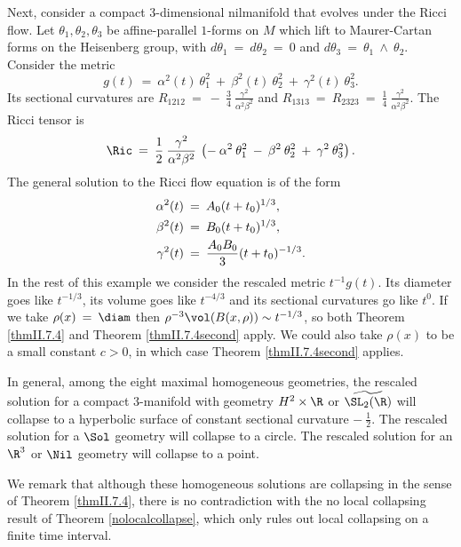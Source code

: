 \begin{remark}
Next, consider a compact
$3$-dimensional nilmanifold that evolves under the Ricci flow.
Let $\theta_1, \theta_2, \theta_3$ be affine-parallel $1$-forms on $M$
which lift to Maurer-Cartan forms on the Heisenberg group, with
$d\theta_1 \: = \: d\theta_2 \: = \: 0$ and $d\theta_3 \: = \:
\theta_1 \: \wedge \: \theta_2$.
Consider the metric
\begin{equation}
g(t) \: = \: \alpha^2(t) \: \theta_1^2 \: + \:
\beta^2(t) \: \theta_2^2 \: + \:
\gamma^2(t) \: \theta_3^2.
\end{equation}
Its sectional curvatures are
$R_{1212} \: = \: - \: \frac34 \: \frac{\gamma^2}{\alpha^2 \beta^2}$ and
$R_{1313} \: = \: R_{2323}
\: = \: \frac14 \: \frac{\gamma^2}{\alpha^2 \beta^2}$.
The Ricci tensor is
\begin{equation}
\Ric \: = \: \frac12 \: \frac{\gamma^2}{\alpha^2 \beta^2} \:
\left( - \: \alpha^2 \: \theta_1^2 \: - \: \beta^2 \: \theta_2^2 \:
+ \: \gamma^2 \: \theta_3^2 \right).
\end{equation}
The general solution to the Ricci flow equation is of the form
\begin{align}
\alpha^2(t) \: & = \: A_0 (t + t_0)^{1/3}, \\
\beta^2(t) \: & = \: B_0 (t + t_0)^{1/3}, \notag \\
\gamma^2(t) \: & = \: \frac{A_0 B_0}{3} (t + t_0)^{-1/3}. \notag
\end{align}
In the rest of this example we consider
the rescaled metric $t^{-1} g(t)$.
Its diameter goes like
$t^{-1/3}$, its volume goes like $t^{-4/3}$
and its sectional curvatures
go like $t^0$. If we take
$\rho(x) \: = \: \diam$ then
$\rho^{-3} \vol(B(x, \rho)) \sim t^{-1/3}$, so both Theorem \ref{thmII.7.4}
and Theorem \ref{thmII.7.4second} apply.
We could also take $\rho(x)$ to be a small constant
$c > 0$, in which case Theorem \ref{thmII.7.4second} applies.


In general, among the eight maximal homogeneous geometries, the
rescaled solution for a compact $3$-manifold with geometry
$H^2 \times \R$ or $\widetilde{\SL_2(\R)}$
will collapse to a hyperbolic surface of constant
sectional curvature $- \: \frac12$.
The rescaled solution for a $\Sol$ geometry will collapse to a circle.
The rescaled solution for an $\R^3$ or $\Nil$ geometry will collapse to
a point.

We remark that although these homogeneous solutions
are collapsing in the sense of Theorem
\ref{thmII.7.4}, there is no contradiction with the
no local collapsing result of Theorem \ref{nolocalcollapse},
which only rules out
local collapsing on a finite time interval.
\end{remark}

